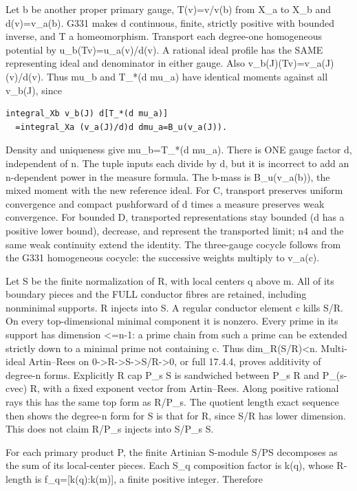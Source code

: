 \documentclass[11pt]{article}
\begin{document}
Let b be another proper primary gauge, T(v)=v/v(b) from X\_a to X\_b and d(v)=v\_a(b). G331 makes d continuous, finite, strictly positive with bounded inverse, and T a homeomorphism. Transport each degree-one homogeneous potential by u\_b(Tv)=u\_a(v)/d(v). A rational ideal profile has the SAME representing ideal and denominator in either gauge. Also v\_b(J)(Tv)=v\_a(J)(v)/d(v). Thus mu\_b and T\_*(d mu\_a) have identical moments against all v\_b(J), since

\begin{Verbatim}[fontsize=\small,breaklines=true,breakanywhere=true]
integral_Xb v_b(J) d[T_*(d mu_a)]
  =integral_Xa (v_a(J)/d)d dmu_a=B_u(v_a(J)).
\end{Verbatim}

Density and uniqueness give mu\_b=T\_*(d mu\_a). There is ONE gauge factor d, independent of n. The tuple inputs each divide by d, but it is incorrect to add an n-dependent power in the measure formula. The b-mass is B\_u(v\_a(b)), the mixed moment with the new reference ideal. For C, transport preserves uniform convergence and compact pushforward of d times a measure preserves weak convergence. For bounded D, transported representations stay bounded (d has a positive lower bound), decrease, and represent the transported limit; n4 and the same weak continuity extend the identity. The three-gauge cocycle follows from the G331 homogeneous cocycle: the successive weights multiply to v\_a(c).

Let S be the finite normalization of R, with local centers q above m. All of its boundary pieces and the FULL conductor fibres are retained, including nonminimal supports. R injects into S. A regular conductor element c kills S/R. On every top-dimensional minimal component it is nonzero. Every prime in its support has dimension <=n-1: a prime chain from such a prime can be extended strictly down to a minimal prime not containing c. Thus dim\_R(S/R)<n. Multi-ideal Artin--Rees on 0->R->S->S/R->0, or full 17.4.4, proves additivity of degree-n forms. Explicitly R cap P\_s S is sandwiched between P\_s R and P\_(s-cvec) R, with a fixed exponent vector from Artin--Rees. Along positive rational rays this has the same top form as R/P\_s. The quotient length exact sequence then shows the degree-n form for S is that for R, since S/R has lower dimension. This does not claim R/P\_s injects into S/P\_s S.

For each primary product P, the finite Artinian S-module S/PS decomposes as the sum of its local-center pieces. Each S\_q composition factor is k(q), whose R-length is f\_q=[k(q):k(m)], a finite positive integer. Therefore
\end{document}
